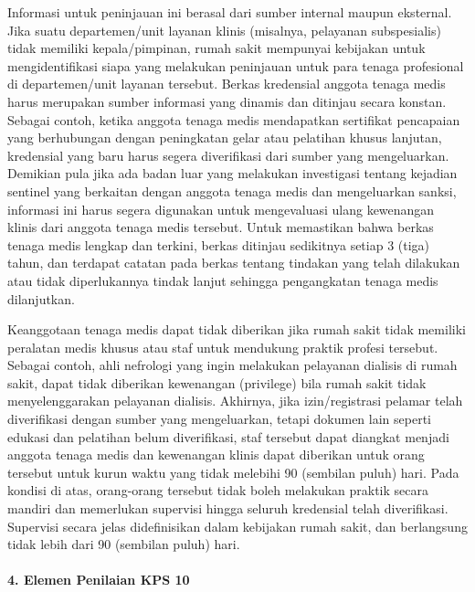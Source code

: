 \documentclass[
]{book}
\begin{document}
Informasi untuk peninjauan ini berasal dari sumber internal maupun eksternal. Jika suatu departemen/unit layanan klinis (misalnya, pelayanan subspesialis) tidak memiliki kepala/pimpinan, rumah sakit mempunyai kebijakan untuk mengidentifikasi siapa yang melakukan peninjauan untuk para tenaga profesional di departemen/unit layanan tersebut. Berkas kredensial anggota tenaga medis harus merupakan sumber informasi yang dinamis dan ditinjau secara konstan. Sebagai contoh, ketika anggota tenaga medis mendapatkan sertifikat pencapaian yang berhubungan dengan peningkatan gelar atau pelatihan khusus lanjutan, kredensial yang baru harus segera diverifikasi dari sumber yang mengeluarkan. Demikian pula jika ada badan luar yang melakukan investigasi tentang kejadian sentinel yang berkaitan dengan anggota tenaga medis dan mengeluarkan sanksi, informasi ini harus segera digunakan untuk mengevaluasi ulang kewenangan klinis dari anggota tenaga medis tersebut. Untuk memastikan bahwa berkas tenaga medis lengkap dan terkini, berkas ditinjau sedikitnya setiap 3 (tiga) tahun, dan terdapat catatan pada berkas tentang tindakan yang telah dilakukan atau tidak diperlukannya tindak lanjut sehingga pengangkatan tenaga medis dilanjutkan.

Keanggotaan tenaga medis dapat tidak diberikan jika rumah sakit tidak memiliki peralatan medis khusus atau staf untuk mendukung praktik profesi tersebut. Sebagai contoh, ahli nefrologi yang ingin melakukan pelayanan dialisis di rumah sakit, dapat tidak diberikan kewenangan (privilege) bila rumah sakit tidak menyelenggarakan pelayanan dialisis.
Akhirnya, jika izin/registrasi pelamar telah diverifikasi dengan sumber yang mengeluarkan, tetapi dokumen lain seperti edukasi dan pelatihan belum diverifikasi, staf tersebut dapat diangkat menjadi anggota tenaga medis dan kewenangan klinis dapat diberikan untuk orang tersebut untuk kurun waktu yang tidak melebihi 90 (sembilan puluh) hari. Pada kondisi di atas, orang-orang tersebut tidak boleh melakukan praktik secara mandiri dan memerlukan supervisi hingga seluruh kredensial telah diverifikasi. Supervisi secara jelas didefinisikan dalam kebijakan rumah sakit, dan berlangsung tidak lebih dari 90 (sembilan puluh) hari.

\hypertarget{elemen-penilaian-kps-10}{%
\paragraph*{4. Elemen Penilaian KPS 10}\label{elemen-penilaian-kps-10}}
\end{document}
